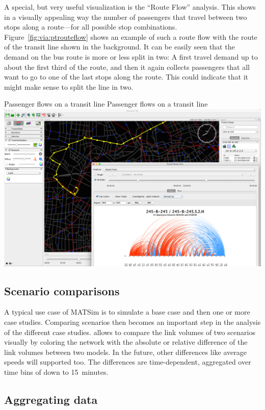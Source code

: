 A special, but very useful visualization is the ``Route Flow'' analysis. This
shows in a visually appealing way the number of passengers that travel between
two stops along a route---for all possible stop combinations.
Figure~\ref{fig:via:ptrouteflow} shows an example of such a route flow with the
route of the transit line shown in the background.
It can be easily seen that the demand on the bus route is more or less split in two: A
first travel demand up to about the first third of the route, and then it again
collects passengers that all want to go to one of the last stops along the
route. This could indicate that it might make sense to split the line in two.

\createfigure%
{Passenger flows on a transit line}%
{Passenger flows on a transit line}%
{\label{fig:via:ptrouteflow}}%
{\includegraphics[width=1.\textwidth,angle=0]{./extending/figures/via/ptrouteflows}}%
{}


\subsection{Scenario comparisons}

A typical use case of MATSim is to simulate a base case and then one or more
case studies. Comparing scenarios then becomes an important step in the analysis
of the different case studies. \Via{} allows to compare the link volumes of two
scenarios visually by coloring the network with the absolute or relative
difference of the link volumes between two models. In the future, other
differences like average speeds will supported too. The differences are
time-dependent, aggregated over time bins of down to 15~minutes.




\subsection{Aggregating data}


